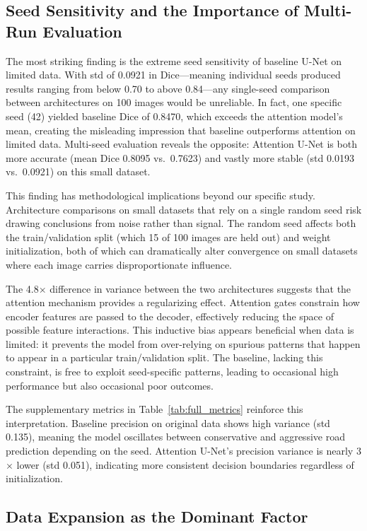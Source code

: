 \documentclass[conference]{IEEEtran}
\begin{document}
\subsection{Seed Sensitivity and the Importance of Multi-Run Evaluation}

The most striking finding is the extreme seed sensitivity of baseline U-Net on limited data. With std of 0.0921 in Dice---meaning individual seeds produced results ranging from below 0.70 to above 0.84---any single-seed comparison between architectures on 100 images would be unreliable. In fact, one specific seed (42) yielded baseline Dice of 0.8470, which exceeds the attention model's mean, creating the misleading impression that baseline outperforms attention on limited data. Multi-seed evaluation reveals the opposite: Attention U-Net is both more accurate (mean Dice 0.8095 vs.\ 0.7623) and vastly more stable (std 0.0193 vs.\ 0.0921) on this small dataset.

This finding has methodological implications beyond our specific study. Architecture comparisons on small datasets that rely on a single random seed risk drawing conclusions from noise rather than signal. The random seed affects both the train/validation split (which 15 of 100 images are held out) and weight initialization, both of which can dramatically alter convergence on small datasets where each image carries disproportionate influence.

The 4.8$\times$ difference in variance between the two architectures suggests that the attention mechanism provides a regularizing effect. Attention gates constrain how encoder features are passed to the decoder, effectively reducing the space of possible feature interactions. This inductive bias appears beneficial when data is limited: it prevents the model from over-relying on spurious patterns that happen to appear in a particular train/validation split. The baseline, lacking this constraint, is free to exploit seed-specific patterns, leading to occasional high performance but also occasional poor outcomes.

The supplementary metrics in Table~\ref{tab:full_metrics} reinforce this interpretation. Baseline precision on original data shows high variance (std 0.135), meaning the model oscillates between conservative and aggressive road prediction depending on the seed. Attention U-Net's precision variance is nearly 3$\times$ lower (std 0.051), indicating more consistent decision boundaries regardless of initialization.

\subsection{Data Expansion as the Dominant Factor}
\end{document}
